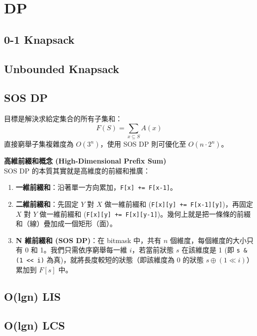 \documentclass[a4paper,10pt,twocolumn,oneside]{article}
\begin{document}
\section{DP}
\subsection{0-1 Knapsack}


\subsection{Unbounded Knapsack}


\subsection{SOS DP}
目標是解決求給定集合的所有子集和：
$$F(S)=\sum_{x\subseteq S}A(x)$$
直接窮舉子集複雜度為 $O(3^n)$，使用 SOS DP 則可優化至 $O(n \cdot 2^n)$。

\textbf{高維前綴和概念 (High-Dimensional Prefix Sum)} \\
SOS DP 的本質其實就是高維度的前綴和推廣：
\begin{enumerate}
    \item \textbf{一維前綴和}：沿著單一方向累加，\texttt{F[x] += F[x-1]}。
    \item \textbf{二維前綴和}：先固定 $Y$ 對 $X$ 做一維前綴和 (\texttt{F[x][y] += F[x-1][y]})，再固定 $X$ 對 $Y$ 做一維前綴和 (\texttt{F[x][y] += F[x][y-1]})。幾何上就是把一條條的前綴和（線）疊加成一個矩形（面）。
    \item \textbf{N 維前綴和 (SOS DP)}：在 bitmask 中，共有 $n$ 個維度，每個維度的大小只有 0 和 1。我們只需依序窮舉每一維 $i$，若當前狀態 $s$ 在該維度是 1 (即 \texttt{s \& (1 << i)} 為真)，就將長度較短的狀態（即該維度為 0 的狀態 $s \oplus (1 \ll i)$）累加到 $F[s]$ 中。
\end{enumerate}


\subsection{O(lgn) LIS}


\subsection{O(lgn) LCS}

\end{document}
